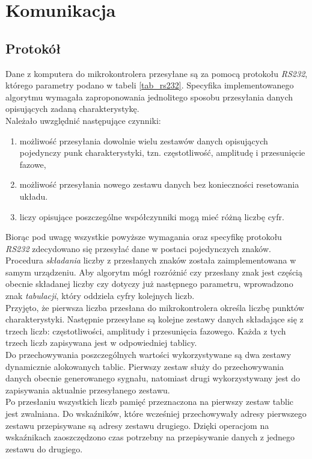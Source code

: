 \section{Komunikacja}

\subsection{Protokół}

Dane z komputera do mikrokontrolera przesyłane są za pomocą protokołu \textit{RS232}, którego parametry podano w tabeli \ref{tab_rs232}. Specyfika implementowanego algorytmu wymagała zaproponowania jednolitego sposobu przesyłania danych opisujących zadaną charakterystykę. \\
Należało uwzględnić następujące czynniki:
\begin{enumerate}
		
	\item możliwość przesyłania dowolnie wielu zestawów danych opisujących pojedynczy punk charakterystyki, tzn. częstotliwość, amplitudę i przesunięcie fazowe,
	\item możliwość przesyłania nowego zestawu danych bez konieczności resetowania układu.
	\item liczy opisujące poszczególne współczynniki mogą mieć różną liczbę cyfr.
\end{enumerate}
%
%
Biorąc pod uwagę wszystkie powyższe wymagania oraz specyfikę protokołu \textit{RS232} zdecydowano się przesyłać dane w postaci pojedynczych znaków. Procedura \textit{składania} liczby z przesłanych znaków została zaimplementowana w samym urządzeniu. Aby algorytm mógł rozróżnić czy przesłany znak jest częścią obecnie składanej liczby czy dotyczy już następnego parametru, wprowadzono znak \textit{tabulacji}, który oddziela cyfry kolejnych liczb.
\\
Przyjęto, że pierwsza liczba przesłana do mikrokontrolera określa liczbę punktów charakterystyki. Następnie przesyłane są kolejne zestawy danych składające się z trzech liczb: częstotliwości, amplitudy i przesunięcia fazowego. Każda z tych trzech liczb zapisywana jest w odpowiedniej tablicy.
\\
Do przechowywania poszczególnych wartości wykorzystywane są dwa zestawy dynamicznie alokowanych tablic. Pierwszy zestaw służy do przechowywania danych obecnie generowanego sygnału, natomiast drugi wykorzystywany jest do zapisywania aktualnie przesyłanego zestawu. 
\\
Po przesłaniu wszystkich liczb pamięć przeznaczona na pierwszy zestaw tablic jest zwalniana. Do wska\'zników, które wcześniej przechowywały adresy pierwszego zestawu przepisywane są adresy zestawu drugiego. Dzięki operacjom na wska\'znikach zaoszczędzono czas potrzebny na przepisywanie danych z jednego zestawu do drugiego. 
